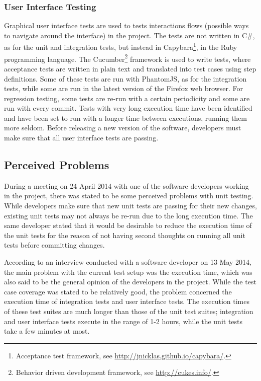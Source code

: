 \documentclass[a4paper,english,12pt]{report}
\begin{document}
\subsubsection{User Interface Testing}
Graphical user interface tests are used to tests interactions flows (possible ways to navigate around the interface) in the project. The tests are not written in C\#, as for the unit and integration tests, but instead in Capybara\footnote{Acceptance test framework, see \url{http://jnicklas.github.io/capybara/}.}, in the Ruby programming language. The Cucumber\footnote{Behavior driven development framework, see \url{http://cukes.info/}.} framework is used to write tests, where acceptance tests are written in plain text and translated into test cases using step definitions. Some of these tests are run with PhantomJS, as for the integration tests, while some are run in the latest version of the Firefox web browser. For regression testing, some tests are re-run with a certain periodicity and some are run with every commit. Tests with very long execution time have been identified and have been set to run with a longer time between executions, running them more seldom. Before releasing a new version of the software, developers must make sure that all user interface tests are passing.

\subsection{Perceived Problems}\label{sec:perceived-problems}
During a meeting on 24 April 2014 with one of the software developers working in the project, there was stated to be some perceived problems with unit testing. While developers make sure that new unit tests are passing for their new changes, existing unit tests may not always be re-run due to the long execution time. The same developer stated that it would be desirable to reduce the execution time of the unit tests for the reason of not having second thoughts on running all unit tests before committing changes.

According to an interview conducted with a software developer on 13 May 2014, the main problem with the current test setup was the execution time, which was also said to be the general opinion of the developers in the project. While the test case coverage was stated to be relatively good, the problem concerned the execution time of integration tests and user interface tests. The execution times of these test suites are much longer than those of the unit test suites; integration and user interface tests execute in the range of 1-2 hours, while the unit tests take a few minutes at most.
\end{document}
